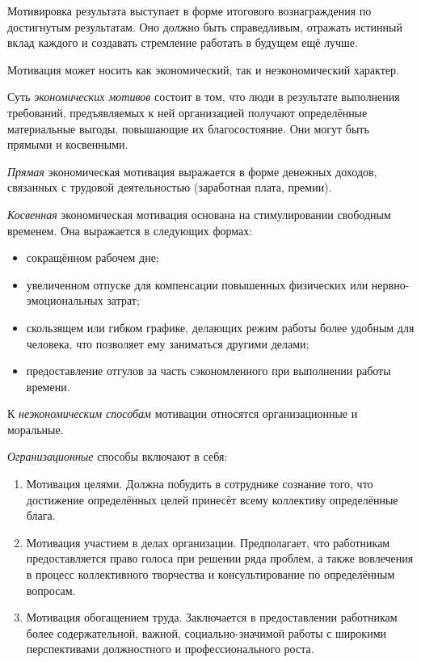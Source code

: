 \documentclass[12pt, russian, oneside, article]{ncc}
\begin{document}
Мотивировка результата выступает в форме итогового вознаграждения по достигнутым результатам. Оно должно быть справедливым, отражать истинный вклад каждого и создавать стремление работать в будущем ещё лучше.

Мотивация может носить как экономический, так и неэкономический характер.

Суть \emph{экономических мотивов} состоит в том, что люди в результате выполнения требований, предъявляемых к ней организацией получают определённые материальные выгоды, повышающие их благосостояние. Они могут быть прямыми и косвенными.

\emph{Прямая} экономическая мотивация выражается в форме денежных доходов, связанных с трудовой деятельностью (заработная плата, премии).

\emph{Косвенная} экономическая мотивация основана на стимулировании свободным временем. Она выражается в следующих формах:
\begin{itemize}
\item сокращённом рабочем дне;
\item увеличенном отпуске для компенсации повышенных физических или нервно-эмоциональных затрат;
\item скользящем или гибком графике, делающих режим работы более удобным для человека, что позволяет ему заниматься другими делами;
\item предоставление отгулов за часть сэкономленного при выполнении работы времени.
\end{itemize}

К \emph{неэкономическим способам} мотивации относятся организационные и моральные.

\emph{Огранизационные} способы включают в себя:
\begin{enumerate}
\item Мотивация целями. Должна побудить в сотруднике сознание того, что достижение определённых целей принесёт всему коллективу определённые блага.
\item Мотивация участием в делах организации. Предполагает, что работникам предоставляется право голоса при решении ряда проблем, а также вовлечения в процесс коллективного творчества и консультирование по определённым вопросам.
\item Мотивация обогащением труда. Заключается в предоставлении работникам более содержательной, важной, социально-значимой работы с широкими перспективами должностного и профессионального роста.
\end{enumerate}
\end{document}
